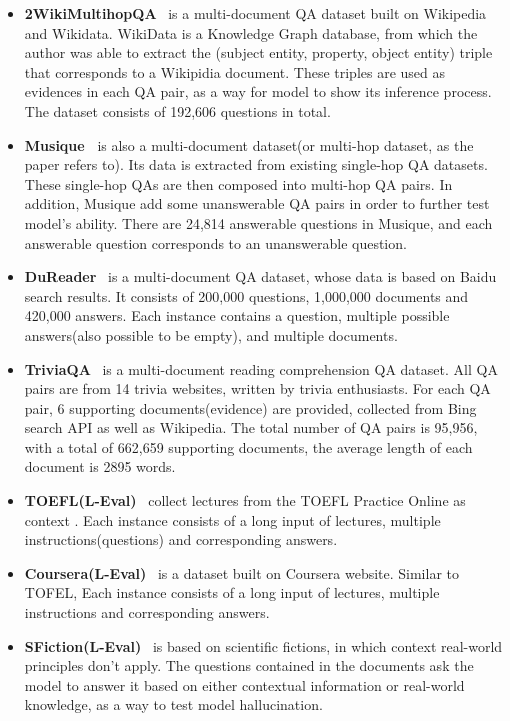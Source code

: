 \begin{itemize}[leftmargin=10pt]
    \item \textbf{2WikiMultihopQA}~\cite{ho_multihopqa_2020} is a multi-document QA dataset built on Wikipedia and Wikidata. WikiData is a Knowledge Graph database, from which the author was able to extract the (subject entity, property, object entity) triple that corresponds to a Wikipidia document. These triples are used as evidences in each QA pair, as a way for model to show its inference process. The dataset consists of 192,606 questions in total.
    \item \textbf{Musique~\cite{trivedi_musique:_2021}} is also a multi-document dataset(or multi-hop dataset, as the paper refers to). Its data is extracted from existing single-hop QA datasets. These single-hop QAs are then composed into multi-hop QA pairs. In addition, Musique add some unanswerable QA pairs in order to further test model's ability. There are 24,814 answerable questions in Musique, and each answerable question corresponds to an unanswerable question.
    \item \textbf{DuReader}~\cite{he_dureader:_2017} is a multi-document QA dataset, whose data is based on Baidu search results. It consists of 200,000 questions, 1,000,000 documents and 420,000 answers. Each instance contains a question, multiple possible answers(also possible to be empty), and multiple documents. 
    \item \textbf{TriviaQA}~\cite{joshi_triviaqa:_2017 } is a multi-document reading comprehension QA dataset. All QA pairs are from 14 trivia websites, written by trivia enthusiasts.  For each QA pair, 6 supporting documents(evidence) are provided, collected from Bing search API as well as Wikipedia. The total number of QA pairs is 95,956, with a total of 662,659 supporting documents, the average length of each document is 2895 words.
    \item \textbf{TOEFL(L-Eval)}~\cite{an_l-eval:_2023} collect lectures from the TOEFL Practice Online as context . Each instance consists of a long input of lectures, multiple instructions(questions) and corresponding answers. 
    \item \textbf{Coursera(L-Eval)}~\cite{an_l-eval:_2023} is a dataset built on Coursera website. Similar to TOFEL, Each instance consists of a long input of lectures, multiple instructions and corresponding answers.     
    \item \textbf{SFiction(L-Eval)}~\cite{an_l-eval:_2023} is based on scientific fictions, in which context real-world principles don't apply. The questions contained in the documents ask the model to answer it based on either contextual information or real-world knowledge, as a way to test model hallucination. 

\end{itemize}
